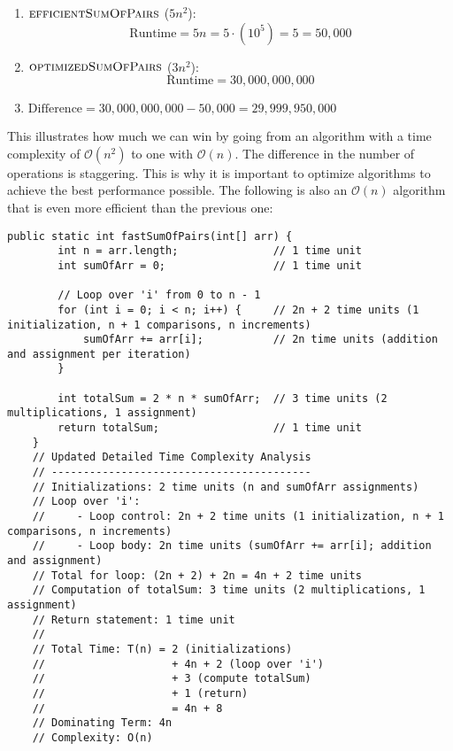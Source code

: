 \begin{enumerate}
    \item $\proc{efficientSumOfPairs}$ (\(5n^2\)):
    \[
    \text{Runtime} = 5n = 5 \cdot (10^5) = 5 = 50,000
    \]
    \item $\proc{optimizedSumOfPairs}$ (\(3n^2\)):
    \[
    \text{Runtime} = 30,000,000,000
    \]
    \item $\text{Difference} = 30,000,000,000 - 50,000 = 29,999,950,000$
\end{enumerate}

This illustrates how much we can win by going from an algorithm with a time complexity of $\mathcal{O}(n^2)$ to one with $\mathcal{O}(n)$. The difference in the number of operations is staggering. This is why it is important to optimize algorithms to achieve the best performance possible. The following is also an $\mathcal{O}(n)$ algorithm that is even more efficient than the previous one:


\begin{lstlisting}[style = javaStyle, caption={Fast Sum of Pairs with Analysis}, label={lst:java_fast_sum_pairs_analysis}]
    public static int fastSumOfPairs(int[] arr) {
        int n = arr.length;               // 1 time unit
        int sumOfArr = 0;                 // 1 time unit
    
        // Loop over 'i' from 0 to n - 1
        for (int i = 0; i < n; i++) {     // 2n + 2 time units (1 initialization, n + 1 comparisons, n increments)
            sumOfArr += arr[i];           // 2n time units (addition and assignment per iteration)
        }
    
        int totalSum = 2 * n * sumOfArr;  // 3 time units (2 multiplications, 1 assignment)
        return totalSum;                  // 1 time unit
    }
    // Updated Detailed Time Complexity Analysis
    // -----------------------------------------
    // Initializations: 2 time units (n and sumOfArr assignments)
    // Loop over 'i':
    //     - Loop control: 2n + 2 time units (1 initialization, n + 1 comparisons, n increments)
    //     - Loop body: 2n time units (sumOfArr += arr[i]; addition and assignment)
    // Total for loop: (2n + 2) + 2n = 4n + 2 time units
    // Computation of totalSum: 3 time units (2 multiplications, 1 assignment)
    // Return statement: 1 time unit
    //
    // Total Time: T(n) = 2 (initializations)
    //                    + 4n + 2 (loop over 'i')
    //                    + 3 (compute totalSum)
    //                    + 1 (return)
    //                    = 4n + 8
    // Dominating Term: 4n
    // Complexity: O(n)
    
\end{lstlisting}  

